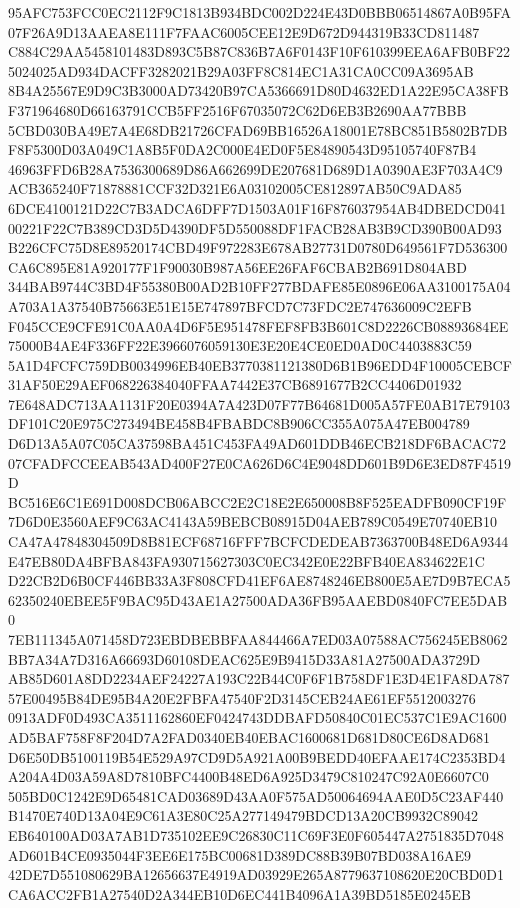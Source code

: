 \documentclass[UTF8,fontset=fandol,zihao=-4,a4paper]{ctexart}
\begin{document}
{{95AFC753FCC0EC2112F9C1813B934BDC002D224E43D0BBB06514867A0B95FA07F26A9D13AAEA8E111F7FAAC6005CEE12E9D672D944319B33CD811487
C884C29AA5458101483D893C5B87C836B7A6F0143F10F610399EEA6AFB0BF225024025AD934DACFF3282021B29A03FF8C814EC1A31CA0CC09A3695AB
8B4A25567E9D9C3B3000AD73420B97CA5366691D80D4632ED1A22E95CA38FBF371964680D66163791CCB5FF2516F67035072C62D6EB3B2690AA77BBB
5CBD030BA49E7A4E68DB21726CFAD69BB16526A18001E78BC851B5802B7DBF8F5300D03A049C1A8B5F0DA2C000E4ED0F5E84890543D95105740F87B4
46963FFD6B28A7536300689D86A662699DE207681D689D1A0390AE3F703A4C9ACB365240F71878881CCF32D321E6A03102005CE812897AB50C9ADA85
6DCE4100121D22C7B3ADCA6DFF7D1503A01F16F876037954AB4DBEDCD04100221F22C7B389CD3D5D4390DF5D550088DF1FACB28AB3B9CD390B00AD93
B226CFC75D8E89520174CBD49F972283E678AB27731D0780D649561F7D536300CA6C895E81A920177F1F90030B987A56EE26FAF6CBAB2B691D804ABD
344BAB9744C3BD4F55380B00AD2B10FF277BDAFE85E0896E06AA3100175A04A703A1A37540B75663E51E15E747897BFCD7C73FDC2E747636009C2EFB
F045CCE9CFE91C0AA0A4D6F5E951478FEF8FB3B601C8D2226CB08893684EE75000B4AE4F336FF22E3966076059130E3E20E4CE0ED0AD0C4403883C59
5A1D4FCFC759DB0034996EB40EB3770381121380D6B1B96EDD4F10005CEBCF31AF50E29AEF068226384040FFAA7442E37CB6891677B2CC4406D01932
7E648ADC713AA1131F20E0394A7A423D07F77B64681D005A57FE0AB17E79103DF101C20E975C273494BE458B4FBABDC8B906CC355A075A47EB004789
D6D13A5A07C05CA37598BA451C453FA49AD601DDB46ECB218DF6BACAC7207CFADFCCEEAB543AD400F27E0CA626D6C4E9048DD601B9D6E3ED87F4519D
BC516E6C1E691D008DCB06ABCC2E2C18E2E650008B8F525EADFB090CF19F7D6D0E3560AEF9C63AC4143A59BEBCB08915D04AEB789C0549E70740EB10
CA47A47848304509D8B81ECF68716FFF7BCFCDEDEAB7363700B48ED6A9344E47EB80DA4BFBA843FA930715627303C0EC342E0E22BFB40EA834622E1C
D22CB2D6B0CF446BB33A3F808CFD41EF6AE8748246EB800E5AE7D9B7ECA562350240EBEE5F9BAC95D43AE1A27500ADA36FB95AAEBD0840FC7EE5DAB0
7EB111345A071458D723EBDBEBBFAA844466A7ED03A07588AC756245EB8062BB7A34A7D316A66693D60108DEAC625E9B9415D33A81A27500ADA3729D
AB85D601A8DD2234AEF24227A193C22B44C0F6F1B758DF1E3D4E1FA8DA78757E00495B84DE95B4A20E2FBFA47540F2D3145CEB24AE61EF5512003276
0913ADF0D493CA3511162860EF0424743DDBAFD50840C01EC537C1E9AC1600AD5BAF758F8F204D7A2FAD0340EB40EBAC1600681D681D80CE6D8AD681
D6E50DB5100119B54E529A97CD9D5A921A00B9BEDD40EFAAE174C2353BD4A204A4D03A59A8D7810BFC4400B48ED6A925D3479C810247C92A0E6607C0
505BD0C1242E9D65481CAD03689D43AA0F575AD50064694AAE0D5C23AF440B1470E740D13A04E9C61A3E80C25A277149479BDCD13A20CB9932C89042
EB640100AD03A7AB1D735102EE9C26830C11C69F3E0F605447A2751835D7048AD601B4CE0935044F3EE6E175BC00681D389DC88B39B07BD038A16AE9
42DE7D551080629BA12656637E4919AD03929E265A8779637108620E20CBD0D1CA6ACC2FB1A27540D2A344EB10D6EC441B4096A1A39BD5185E0245EB
}}
\end{document}

